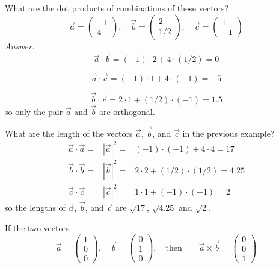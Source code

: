 \myhrule
\begin{myex}
What are the dot products of combinations of these vectors?
$$
  \vec{a} = \begin{pmatrix} -1 \\ 4 \end{pmatrix}, \quad
  \vec{b} = \begin{pmatrix} 2 \\ 1/2 \end{pmatrix}, \quad
  \vec{c} = \begin{pmatrix} 1 \\ -1 \end{pmatrix}
$$
\emph{Answer:}
$$
   \vec{a}\cdot\vec{b} = (-1)\cdot 2 + 4\cdot(1/2) = 0
$$

$$
   \vec{a}\cdot\vec{c} = (-1)\cdot 1 + 4\cdot(-1) = -5
$$

$$
   \vec{b}\cdot\vec{c} = 2\cdot 1 + (1/2)\cdot(-1) = 1.5 
$$
so only the pair $\vec{a}$ and $\vec{b}$ are orthogonal.
\end{myex}


\begin{myex}
What are the length of the vectors $\vec{a}$, $\vec{b}$, and $\vec{c}$ in the 
previous example?
\begin{eqnarray*}
\vec{a}\cdot\vec{a} =& |\vec{a}|^2 =& (-1)\cdot(-1) + 4\cdot4 = 17 \\
\vec{b}\cdot\vec{b} =& |\vec{b}|^2 =& 2\cdot2 + (1/2)\cdot(1/2) = 4.25 \\ 
\vec{c}\cdot\vec{c} =& |\vec{c}|^2 =& 1\cdot1 + (-1)\cdot(-1) = 2 
\end{eqnarray*}
so the lengths of $\vec{a}$, $\vec{b}$, and $\vec{c}$  
are $\sqrt{17}$, $\sqrt{4.25}$ and $\sqrt{2}$. 
\end{myex}


\begin{myex}
If the two vectors
$$
   \vec{a} = \begin{pmatrix} 1 \\ 0 \\ 0 \end{pmatrix},\quad \vec{b} = \begin{pmatrix} 0 \\ 1 \\ 0 \end{pmatrix} ,\quad  \text{then} \qquad
   \vec{a}\times\vec{b} = \begin{pmatrix} 0 \\ 0 \\ 1 \end{pmatrix}
$$
\end{myex}
